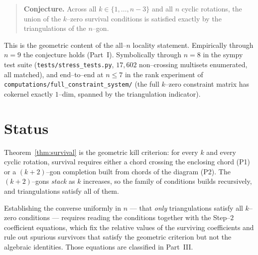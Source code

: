 \documentclass[11pt]{article}
\theoremstyle{definition}
\begin{document}
\begin{quote}
\textbf{Conjecture.} Across all $k\in\{1,\dots,n{-}3\}$ and all $n$ cyclic rotations,
the union of the $k$--zero survival conditions is satisfied exactly by the
triangulations of the $n$--gon.
\end{quote}

This is the geometric content of the all--$n$ locality statement.
Empirically through $n=9$ the conjecture holds (Part~I).
Symbolically through $n=8$ in the sympy test suite
(\texttt{tests/stress\_tests.py}, $17{,}602$ non--crossing multisets enumerated, all
matched), and end--to--end at $n\le 7$ in the rank experiment of
\texttt{computations/full\_constraint\_system/} (the full $k$--zero constraint matrix
has cokernel exactly $1$--dim, spanned by the triangulation indicator).

\section{Status}\label{sec:status}
Theorem~\ref{thm:survival} is the geometric kill criterion: for every $k$ and every
cyclic rotation, survival requires either a chord crossing the enclosing chord (P1) or
a $(k{+}2)$--gon completion built from chords of the diagram (P2). The
$(k{+}2)$--gons \emph{stack} as $k$ increases, so the family of conditions builds
recursively, and triangulations satisfy all of them.

Establishing the converse uniformly in $n$ --- that \emph{only} triangulations satisfy
all $k$--zero conditions --- requires reading the conditions together with the
Step--$2$ coefficient equations, which fix the relative values of the surviving
coefficients and rule out spurious survivors that satisfy the geometric criterion but
not the algebraic identities. Those equations are classified in Part~III.
\end{document}
